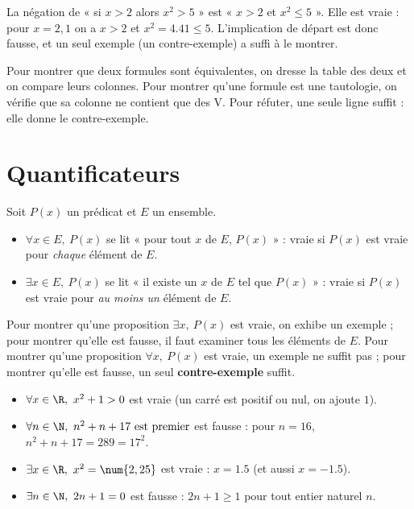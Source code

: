 \begin{example}
La négation de « si $x>2$ alors $x^2>5$ » est « $x>2$ et $x^2\le5$ ». Elle est vraie : pour $x=2,1$ on a $x>2$ et $x^2=\num{4,41}\le5$. L'implication de départ est donc fausse, et un seul exemple (un contre-exemple) a suffi à le montrer.
\end{example}
\begin{method}
Pour montrer que deux formules sont équivalentes, on dresse la table des deux et on compare leurs colonnes. Pour montrer qu'une formule est une tautologie, on vérifie que sa colonne ne contient que des V. Pour réfuter, une seule ligne suffit : elle donne le contre-exemple.
\end{method}

\section{Quantificateurs}
\begin{definition}[Quantificateurs]
Soit $P(x)$ un prédicat et $E$ un ensemble.
\begin{itemize}
\item $\forall x\in E,\ P(x)$ se lit « pour tout $x$ de $E$, $P(x)$ » : vraie si $P(x)$ est vraie pour \emph{chaque} élément de $E$.
\item $\exists x\in E,\ P(x)$ se lit « il existe un $x$ de $E$ tel que $P(x)$ » : vraie si $P(x)$ est vraie pour \emph{au moins un} élément de $E$.
\end{itemize}
\end{definition}
\begin{keypoint}
Pour montrer qu'une proposition $\exists x,\ P(x)$ est vraie, on exhibe un exemple ; pour montrer qu'elle est fausse, il faut examiner tous les éléments de $E$. Pour montrer qu'une proposition $\forall x,\ P(x)$ est vraie, un exemple ne suffit pas ; pour montrer qu'elle est fausse, un seul \textbf{contre-exemple} suffit.
\end{keypoint}
\begin{example}
\begin{itemize}
\item $\forall x\in\R,\ x^2+1>0$ est vraie (un carré est positif ou nul, on ajoute $1$).
\item $\forall n\in\N,\ n^2+n+17\text{ est premier}$ est fausse : pour $n=16$, $n^2+n+17=289=17^2$.
\item $\exists x\in\R,\ x^2=\num{2,25}$ est vraie : $x=\num{1,5}$ (et aussi $x=-\num{1,5}$).
\item $\exists n\in\N,\ 2n+1=0$ est fausse : $2n+1\ge1$ pour tout entier naturel $n$.
\end{itemize}
\end{example}
